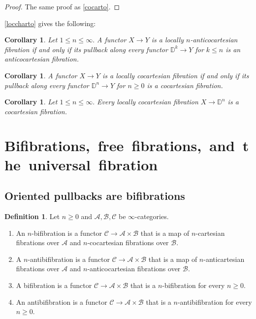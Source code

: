 \documentclass[10pt,oneside]{article}
\numberwithin{equation}{section} %
\numberwithin{figure}{section} %
\theoremstyle{plain}
\newtheorem{corollary}[theorem]{Corollary}
\theoremstyle{definition}
\newtheorem{definition}[theorem]{Definition}
\newcommand{\bD}{{\mathbb D}}
\newcommand{\mA}{{\mathcal A}}
\newcommand{\mB}{{\mathcal B}}
\newcommand{\mC}{{\mathcal C}}
\newcommand{\bk}{{k}}
\begin{document}
\begin{proof}
The same proof as \cref{cocarto}.
\end{proof}

\cref{loccharto} gives the following:

\begin{corollary}Let $1 \leq n \leq \infty.$
A functor $X \to Y$ is a locally $n$-anticocartesian fibration if and only if its pullback along every functor $\bD^\bk \to Y$ for $\bk \leq n$ is an anticocartesian fibration.	
    
\end{corollary}

\begin{corollary}
A functor $X \to Y$ is a locally cocartesian fibration if and only if its pullback along every functor $\bD^n \to Y$ for $n \geq 0$ is a cocartesian fibration.	
    
\end{corollary}

\begin{corollary}Let $1 \leq n \leq \infty.$
Every locally cocartesian fibration $X \to \bD^n$ is a cocartesian fibration.	
    
\end{corollary}

\section{\mbox{Bifibrations, free fibrations, and the universal fibration}}

\subsection{Oriented pullbacks are bifibrations}

\begin{definition}

Let $ n \geq 0 $ and $\mA,\mB,\mC$ be $\infty$-categories.

\begin{enumerate}[\normalfont(1)]\setlength{\itemsep}{-2pt}
\item An $n$-bifibration 
is a functor $\mC \to \mA \times \mB $ that is a map of $n$-cartesian fibrations over $\mA$ and $n$-cocartesian fibrations over $\mB.$

\item A $n$-antibifibration 
is a functor $\mC \to \mA \times \mB $ that is a map of $n$-anticartesian fibrations over $\mA$ and $n$-anticocartesian fibrations over $\mB.$

\item A bifibration 
is a functor $\mC \to \mA \times \mB $ that is a $n$-bifibration for every $n \geq 0.$

\item An antibifibration 
is a functor $\mC \to \mA \times \mB $ that is a $n$-antibifibration for every $n \geq 0.$
\end{enumerate}

\end{definition}
\end{document}
